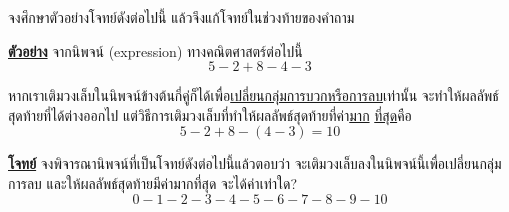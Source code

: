 \question{}

จงศึกษาตัวอย่างโจทย์ดังต่อไปนี้ แล้วจึงแก้โจทย์ในช่วงท้ายของคำถาม

\smallskip\noindent
\textbf{\uline{ตัวอย่าง}}\; จากนิพจน์ (expression) ทางคณิตศาสตร์ต่อไปนี้
\[
    \mathrm{5 - 2 + 8 - 4 - 3}
\]

หากเราเติมวงเล็บในนิพจน์ข้างต้นกี่คู่ก็ได้เพื่อ\uline{เปลี่ยนกลุ่มการบวกหรือการลบ}เท่านั้น\hrsp%
จะทำให้ผลลัพธ์สุดท้ายที่ได้ต่างออกไป\;
แต่วิธีการเติมวงเล็บที่ทำให้ผลลัพธ์สุดท้ายที่ค่า\uline{มาก} \uline{ที่สุด}คือ
\[
    \mathrm{5 - 2 + 8 - (4 - 3) = 10}
\]

\noindent
\textbf{\uline{โจทย์}}\; จงพิจารณานิพจน์ที่เป็นโจทย์ดังต่อไปนี้แล้วตอบว่า 
จะเติมวงเล็บลงในนิพจน์นี้เพื่อเปลี่ยนกลุ่มการลบ 
และให้ผลลัพธ์สุดท้ายมีค่ามากที่สุด จะได้ค่าเท่าใด?
\[
    \mathrm{0 - 1 - 2 - 3 - 4 - 5 - 6 - 7 - 8 - 9 - 10}
\]

